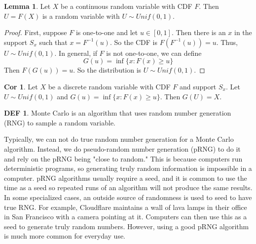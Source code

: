 \documentclass{article}
\theoremstyle{definition}\newtheorem{definition}{DEF}
\theoremstyle{definition}\newtheorem{example}{Ex}
\theoremstyle{lemma}\newtheorem{lemma}{Lemma}
\theoremstyle{corrolary}\newtheorem{corrolary}{Cor}
\begin{document}
\begin{lemma}
Let $X$ be a continuous random variable with CDF $F$.
Then $U= F(X)$ is a random variable with $U\sim Unif(0,1)$.
\end{lemma}
\begin{proof}
First, suppose $F$ is one-to-one and let $u\in [0,1]$.
Then there is an $x$ in the support $S_x$ such that $x=F^{-1}(u)$.
So the CDF is $F(F^{-1}(u))=u$.
Thus, $U\sim Unif(0,1)$.
In general, if $F$ is not one-to-one, we can define
\begin{equation*}
G(u)=\inf\{x : F(x)\ge u\}
\end{equation*}
Then $F(G(u))=u$.
So the distribution is $U\sim Unif(0,1)$.
\end{proof}
\begin{corrolary}
Let $X$ be a discrete random variable with CDF $F$ and support $S_x$.
Let $U\sim Unif(0,1)$ and $G(u)=\inf\{x : F(x)\ge u\}$.
Then $G(U)=X$.
\end{corrolary}

\begin{definition}
Monte Carlo is an algorithm that uses random number generation (RNG) to sample a random variable.
\end{definition}

Typically, we can not do true random number generation for a Monte Carlo algorithm.
Instead, we do pseudo-random number generation (pRNG) to do it and rely on the pRNG being "close to random."
This is because computers run deterministic programs, so generating truly random information is impossible in a computer.
pRNG algorithms usually require a seed, and it is common to use the time as a seed so repeated runs of an algorithm will not produce the same results.
In some specialized cases, an outside source of randomness is used to seed to have true RNG.
For example, Cloudflare maintains a wall of lava lamps in their office in San Francisco with a camera pointing at it.
Computers can then use this as a seed to generate truly random numbers.
However, using a good pRNG algorithm is much more common for everyday use.
\end{document}
